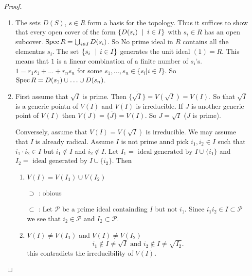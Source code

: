\begin{proof}
	\begin{enumerate}
		\item The sets $D(S)$, $s \in R$ form a basis for the topology. Thus it suffices to show that every open cover of the form $\{D(s_i) \st i \in I\} $ with $s_i \in R$ has an open subcover.
			$\operatorname{Spec} R = \bigcup_{i \in I}  D(s_i)$. 
			So No prime ideal in $R$ contains all the elementns $s_i$. 
			The set $\{ s_i \st i \in I\} $ generates the unit ideal $(1) = R$.
			This means that $1$ is a linear combination of a finite number of $s_i $'s. $1 = r_1 s_1 + \ldots  + r_n s_n$ for some $s_1, \ldots, s_n \in \{s_i | i \in I\} $. So $\operatorname{Spec} R = D(s_1) \cup \ldots \cup D(s_n)$.
		\item \ltr First assume that $\sqrt{I}  $ is prime. 
			Then $\overline{\{\sqrt{I} \} } = V(\sqrt{I} ) = V(I)$. 
			So that $\sqrt{I}  $ is a generic pointn of $V(I)$ and $V(I)$ is irreducible.
			If $J$ is another generic point of $V(I)$ then $V(J) = \overline{\{J\} } = V(I)$. So $J = \sqrt{I} $ ($J$ is prime).

			\rtl Conversely, assume that $V(I) = V(\sqrt{I} )$ is irreducible. 
			We may assume that $I$ is already radical. Assume $I$ is not prime annd pick $i_1, i_2 \in I$ such that $i_1 \cdot i_2 \in I$ but $i_1 \not\in I$ and $i_2 \not\in I$. 
			Let $I_1 = \text{ ideal generated by } I \cup \{i_1\} $ and $I_2 = \text{ ideal generated by } I \cup \{ i_2\} $. 
			Then 
			\begin{enumerate}
				\item $V(I)  = V(I_1) \cup V(I_2)$

					$\supset$ : obious

					$\subset $ : Let $\mathcal{P} $ be a prime ideal containding $I$ but not $i_1$. Since $i_1i_2 \in I \subset \mathcal{P} $ we see that $i_2 \in \mathcal{P} $ and $I_2 \subset  \mathcal{P}$.

				\item $V(I) \ne V(I_1)$ and $V(I) \ne V(I_2)$
					\[
						i_1 \not\in  I \ne \sqrt{I} \text{ and } i_2 \not\in  I \ne \sqrt{I_2} 
					.\]  
					this contradicts the irreducibility of $V(I)$. 
			\end{enumerate}
	\end{enumerate}
\end{proof}
